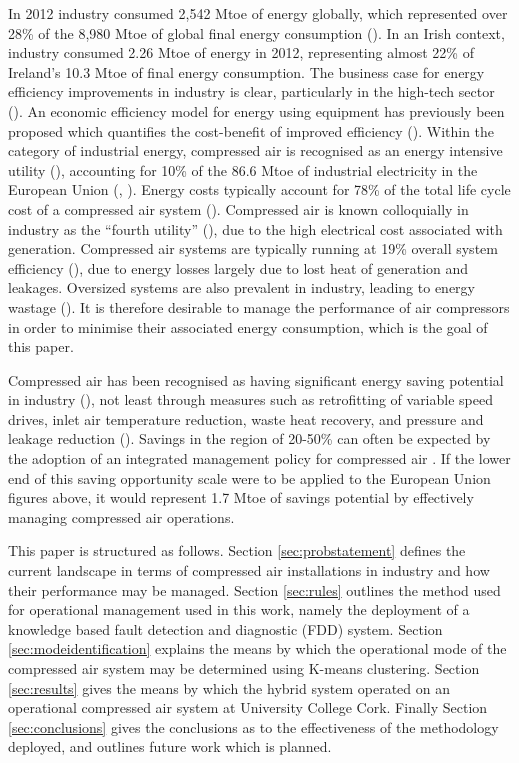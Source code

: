 In 2012 industry consumed 2,542 Mtoe of energy globally, which represented  over 28\% of the 8,980 Mtoe of global final energy consumption (\cite{IEA2012}). In an Irish context, industry consumed 2.26 Mtoe of energy in 2012, representing almost 22\% of Ireland’s 10.3 Mtoe of final energy consumption. The business case for energy efficiency improvements in industry is clear, particularly in the high-tech sector (\cite{Mills2007}). An economic efficiency model for energy using equipment has previously been proposed which quantifies the cost-benefit of improved efficiency (\cite{Blum2014}). Within the category of industrial energy, compressed air is recognised as an energy intensive utility (\cite{Wang2013a}), accounting for 10\% of the 86.6 Mtoe of industrial electricity in the European Union (\cite{Saidur2010}, \cite{Eurostat2014}). Energy costs typically account for 78\% of the total life cycle cost of a compressed air system (\cite{radgen2006efficiency}). Compressed air is known colloquially in industry as the “fourth utility” (\cite{Fairest2014}), due to the high electrical cost associated with generation. Compressed air systems are typically running at 19\% overall system efficiency (\cite{Saidur2010}), due to energy losses largely due to lost heat of generation and leakages. Oversized systems are also prevalent in industry, leading to energy wastage (\cite{Laurijssen2013}). It is therefore desirable to manage the performance of air compressors in order to minimise their associated energy consumption, which is the goal of this paper.

\bigskip

Compressed air has been recognised as having significant energy saving potential in industry (\cite{Wang2014}), not least through measures such as retrofitting of variable speed drives, inlet air temperature reduction, waste heat recovery, and pressure and leakage reduction (\cite{Wang2008}). Savings in the region of 20-50\% can often be expected by the adoption of an integrated management policy for compressed air \cite{SEAI2007a}. If the lower end of this saving opportunity scale were to be applied to the European Union figures above, it would represent 1.7 Mtoe of savings potential by effectively managing compressed air operations. 

This paper is structured as follows. Section \ref{sec:probstatement} defines the current landscape in terms of compressed air installations in industry and how their performance may be managed. Section \ref{sec:rules} outlines the method used for operational management used in this work, namely the deployment of a knowledge based fault detection and diagnostic (FDD) system. Section \ref{sec:modeidentification} explains the means by which the operational mode of the compressed air system may be determined using K-means clustering. Section \ref{sec:results} gives the means by which the hybrid system operated on an operational compressed air system at University College Cork. Finally Section \ref{sec:conclusions} gives the conclusions as to the effectiveness of the methodology deployed, and outlines future work which is planned.

